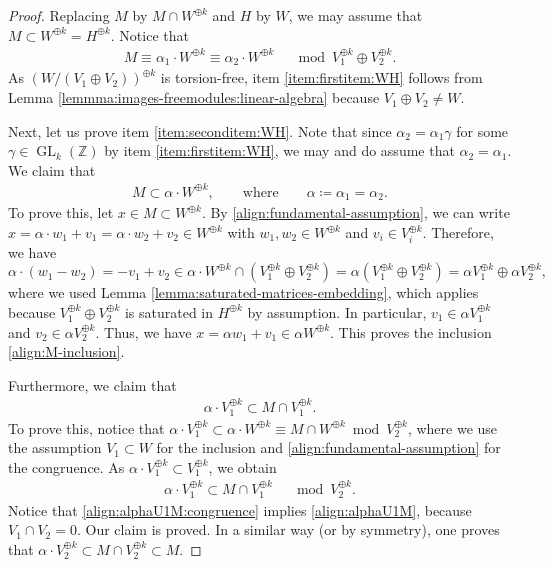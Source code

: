 \documentclass[a4paper,11pt,reqno]{amsart}
\numberwithin{equation}{section}
\theoremstyle{plain}
\theoremstyle{definition}
\newcommand{\Z}{\mathbb Z}
\newcommand{\GL}{\operatorname{GL}}
\begin{document}
\begin{proof}
Replacing $M$ by $M \cap W^{\oplus k}$ and $H$ by $W$, we may assume that $M \subset W^{\oplus k} = H^{\oplus k}$. 
Notice that
\begin{align} \label{align:noticethat-align}
M \equiv \alpha_1 \cdot W^{\oplus k} \equiv \alpha_2 \cdot W^{\oplus k} \quad \mod V_1^{\oplus k} \oplus V_2^{\oplus k}.
\end{align}
As $(W/(V_1\oplus V_2))^{\oplus k}$ is torsion-free, item \eqref{item:firstitem:WH} follows from Lemma \ref{lemmma:images-freemodules:linear-algebra} because $V_1 \oplus V_2 \neq W$. 

Next, let us prove item \eqref{item:seconditem:WH}. Note that since $\alpha_2 = \alpha_1\gamma$ for some $\gamma \in \GL_k(\Z)$ by item \eqref{item:firstitem:WH}, we may and do assume that $\alpha_2 = \alpha_1$. 
We claim that
\begin{align} \label{align:M-inclusion}
M 
\subset \alpha \cdot W^{\oplus k}, \quad \quad \text{where} \quad \quad \alpha \coloneqq \alpha_1 = \alpha_2.  
\end{align}
To prove this, let $x \in M \subset W^{\oplus k}$. By \eqref{align:fundamental-assumption},  
we can write 
$
x = \alpha \cdot w_1 + v_1 = \alpha \cdot w_2 + v_2 \in W^{\oplus k}$ with $w_1, w_2 \in W^{\oplus k}$ and $ v_i \in V_i^{\oplus k}$. 
Therefore, we have
\[
\alpha \cdot \left( w_1 - w_2 \right) = - v_{1} + v_{2} \in \alpha \cdot W^{\oplus k} \cap \left(V_1^{\oplus k} \oplus V_2^{\oplus k} \right) = \alpha \left( V_1^{\oplus k} \oplus V_2^{\oplus k}\right) = \alpha V_1^{\oplus k} \oplus \alpha V_2^{\oplus k},
\] 
where we used Lemma \ref{lemma:saturated-matrices-embedding}, which applies because $V_1^{\oplus k} \oplus V_2^{\oplus k} $ is saturated in $H^{\oplus k}$ by assumption.
In particular, $v_1 \in \alpha V_1^{\oplus k}$ and $v_2 \in \alpha V_2^{\oplus k}$. Thus, we have $
x = \alpha w_1 + v_1 \in \alpha W^{\oplus k}$. This proves the inclusion \eqref{align:M-inclusion}. 

Furthermore, we claim that 
\begin{align} \label{align:alphaU1M}
\alpha \cdot V_1^{\oplus k} \subset M \cap V_1^{\oplus k}. 
\end{align}
To prove this, notice that  
$
\alpha \cdot V_1^{\oplus k} \subset \alpha \cdot W^{\oplus k} \equiv M \cap W^{\oplus k} \bmod  V_2^{\oplus k}$, where we use the assumption $V_1\subset W$ for the inclusion and \eqref{align:fundamental-assumption} for the congruence.
As $\alpha \cdot V_1^{\oplus k} \subset V_1^{\oplus k}$, we obtain
\begin{align} \label{align:alphaU1M:congruence}
\alpha \cdot V_1^{\oplus k} \subset M \cap V_1^{\oplus k} \quad \mod V_2^{\oplus k}. 
\end{align}
Notice that \eqref{align:alphaU1M:congruence} implies \eqref{align:alphaU1M}, because $V_1 \cap V_2 = 0$. Our claim is proved.  
In a similar way (or by symmetry), one proves that $\alpha \cdot V_2^{\oplus k} \subset M \cap V_2^{\oplus k} \subset M$. 


\end{proof}
\end{document}
